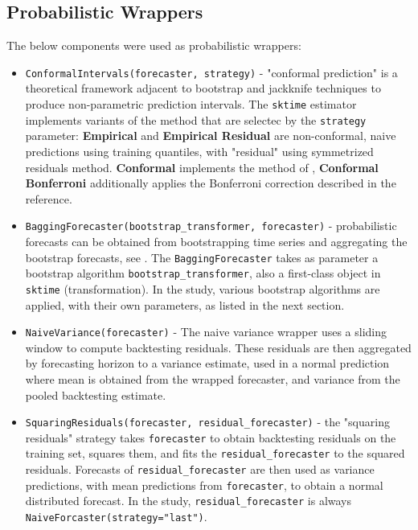 \subsection{Probabilistic Wrappers}
The below components were used as probabilistic wrappers:


\begin{itemize}
    
    \item \texttt{ConformalIntervals(forecaster, strategy)} - "conformal prediction" is a theoretical framework adjacent to bootstrap and jackknife techniques to produce non-parametric prediction intervals. The \texttt{sktime} estimator implements variants of the method that are selectec by the \texttt{strategy} parameter: \textbf{Empirical} and \textbf{Empirical Residual} are non-conformal, naive predictions using training quantiles, with "residual" using symmetrized residuals method. \textbf{Conformal} implements the method of \cite{Stankeviciute2021}, \textbf{Conformal Bonferroni} additionally applies the Bonferroni correction described in the reference.

    \item \texttt{BaggingForecaster(bootstrap\_transformer, forecaster)} - probabilistic forecasts can be obtained from bootstrapping time series and aggregating the bootstrap forecasts, see \cite{hyndman2018,bergmeir2016}. The \texttt{BaggingForecaster} takes as parameter a bootstrap algorithm \texttt{bootstrap\_transformer}, also a first-class object in \texttt{sktime} (transformation). In the study, various bootstrap algorithms are applied, with their own parameters, as listed in the next section.

    \item \texttt{NaiveVariance(forecaster)} - The naive variance wrapper uses a sliding window to compute backtesting residuals. These residuals are then aggregated by forecasting horizon to a variance estimate, used in a normal prediction where mean is obtained from the wrapped forecaster, and variance from the pooled backtesting estimate.

    \item \texttt{SquaringResiduals(forecaster, residual\_forecaster)} - the "squaring residuals" strategy takes \texttt{forecaster} to obtain backtesting residuals on the training set, squares them, and fits the \texttt{residual\_forecaster} to the squared residuals. Forecasts of \texttt{residual\_forecaster} are then used as variance predictions, with mean predictions from \texttt{forecaster}, to obtain a normal distributed forecast. In the study, \texttt{residual\_forecaster} is always \texttt{NaiveForcaster(strategy="last")}.

\end{itemize}


